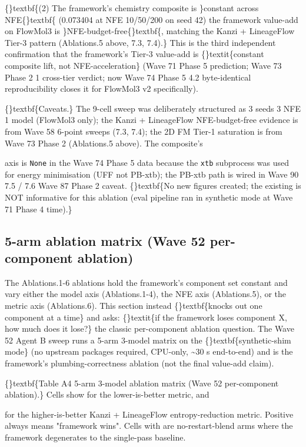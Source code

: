 \documentclass{article}
\begin{document}
\{\}textbf\{(2) The framework's chemistry composite is \}constant across NFE\{\}textbf\{ (0.073404 at NFE 10/50/200 on seed 42)  the framework value-add on FlowMol3 is \}NFE-budget-free\{\}textbf\{, matching the Kanzi + LineageFlow Tier-3 pattern (Ablations.5 above, 7.3, 7.4).\} This is the third independent confirmation that the framework's Tier-3 value-add is \{\}textit\{constant composite lift, not NFE-acceleration\} (Wave 71 Phase 5 prediction; Wave 73 Phase 2 1 cross-tier verdict; now Wave 74 Phase 5 4.2 byte-identical reproducibility closes it for FlowMol3 v2 specifically).

\{\}textbf\{Caveats.\} The 9-cell sweep was deliberately structured as 3 seeds  3 NFE  1 model (FlowMol3 only); the Kanzi + LineageFlow NFE-budget-free evidence is from Wave 58 6-point sweeps (7.3, 7.4); the 2D FM Tier-1 saturation is from Wave 73 Phase 2 (Ablations.5 above). The composite's

 axis is \texttt{None} in the Wave 74 Phase 5 data because the \texttt{xtb} subprocess was used for energy minimisation (UFF not PB-xtb); the PB-xtb path is wired in Wave 90 7.5 / 7.6 Wave 87 Phase 2 caveat. \{\}textbf\{No new figures created; the existing  is NOT informative for this ablation (eval pipeline ran in synthetic mode at Wave 71 Phase 4 time).\}

\subsection{5-arm ablation matrix (Wave 52 per-component ablation)}
The Ablations.1-6 ablations hold the framework's component set constant and vary either the model axis (Ablations.1-4), the NFE axis (Ablations.5), or the metric axis (Ablations.6). This section instead \{\}textbf\{knocks out one component at a time\} and asks: \{\}textit\{if the framework loses component X, how much does it lose?\}  the classic per-component ablation question. The Wave 52 Agent B sweep runs a 5-arm  3-model matrix on the \{\}textbf\{synthetic-shim mode\} (no upstream packages required, CPU-only, \textasciitilde{}30 s end-to-end) and is the framework's plumbing-correctness ablation (not the final value-add claim).

\{\}textbf\{Table A4  5-arm  3-model ablation matrix (Wave 52 per-component ablation).\} Cells show  for the lower-is-better  metric, and

 for the higher-is-better Kanzi + LineageFlow entropy-reduction metric. Positive always means "framework wins". Cells with  are no-restart-blend arms where the framework degenerates to the single-pass baseline.
\end{document}
